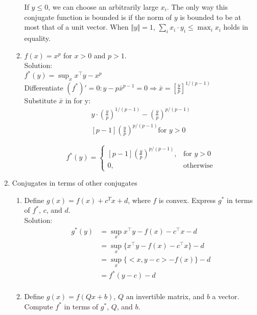 \documentclass[12pt]{amsart}
\newcommand{\norm}[1]{\Vert #1 \Vert}
\begin{document}
\begin{enumerate}
\begin{enumerate}
If $y \leq 0$, we can choose an arbitrarily large $x_i$.  The only way this conjugate function is bounded is if the norm of $y$ is bounded to be at most that of a unit vector.  When $ \norm y =1$, $\displaystyle \sum_i x_i \cdot y_i \leq \max_i x_i$ holds in equality.\\


\item $f(x) = x^p$ for $x > 0$ and $p > 1$. \\

Solution:\\
$ \displaystyle
f^*(y) = \sup_x x^\top y - x^p$\\
Differentiate $(f^*)' = 0: y - p \bar x^{p-1} = 0 \Rightarrow \bar x = [\frac{y}{p}]^{1/(p-1)}$\\
Substitute $\bar x$ in for y:
\begin{align*}
y \cdot (\frac{y}{p})^{1/(p-1)} - (\frac{y}{p})^{p/(p-1)} \\
[p-1](\frac{y}{p})^{p/(p-1)} \text{for $y > 0$}
\end{align*}

\begin{equation*}
f^*(y) = \begin{cases}
[p-1](\frac{y}{p})^{p/(p-1)} ,& \text{for $y>0$}\\
0 ,& \text{otherwise}
\end{cases}
\end{equation*}
\end{enumerate}

\item Conjugates in terms of other conjugates

\begin{enumerate}

\item Define $g(x) = f(x) + c^Tx + d$, where $f$ is convex. Express $g^*$ in terms of $f^*$, $c$, and $d$. \\

\noindent
Solution:
\begin{align*}
g^*(y) &= \sup_x x^\top y - f(x) - c^\top x - d \\
          &= \sup_x \{x^\top y - f(x) - c^\top x\} -d\\
	  &= \sup_x \{<x, y-c> - f(x)\} - d\\
          &= f^*(y-c) -d \\
\end{align*}

\item Define $g(x) = f(Qx + b)$, $Q$ an invertible matrix, and $b$ a vector. Compute $f^*$ in terms of $g^*$, $Q$, and $b$.\\


\end{enumerate}
\end{enumerate}
\end{document}
